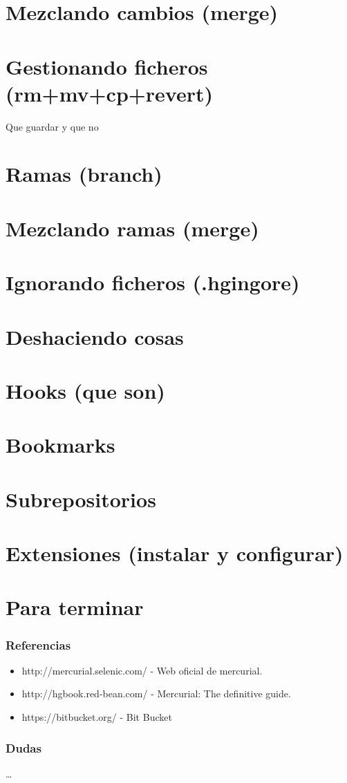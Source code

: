 \documentclass[10pt]{beamer}
\begin{document}
  \section*{Mezclando cambios (merge)}
  \section*{Gestionando ficheros (rm+mv+cp+revert)}
    Que guardar y que no
  \section*{Ramas (branch)}
  \section*{Mezclando ramas (merge)}
  \section*{Ignorando ficheros (.hgingore)}
  \section*{Deshaciendo cosas}
  \section*{Hooks (que son)}
  \section*{Bookmarks}
  \section*{Subrepositorios}
  \section*{Extensiones (instalar y configurar)}

  \section*{Para terminar}

  \begin{frame}
    \frametitle{Referencias}
    \begin{itemize}
      \item \small{http://mercurial.selenic.com/ - Web oficial de mercurial.}
      \item \small{http://hgbook.red-bean.com/ - Mercurial: The definitive guide.}
      \item \small{https://bitbucket.org/ - Bit Bucket}
    \end{itemize}
  \end{frame}

  \begin{frame}
    \frametitle{Dudas}
    \dots
  \end{frame}
\end{document}
